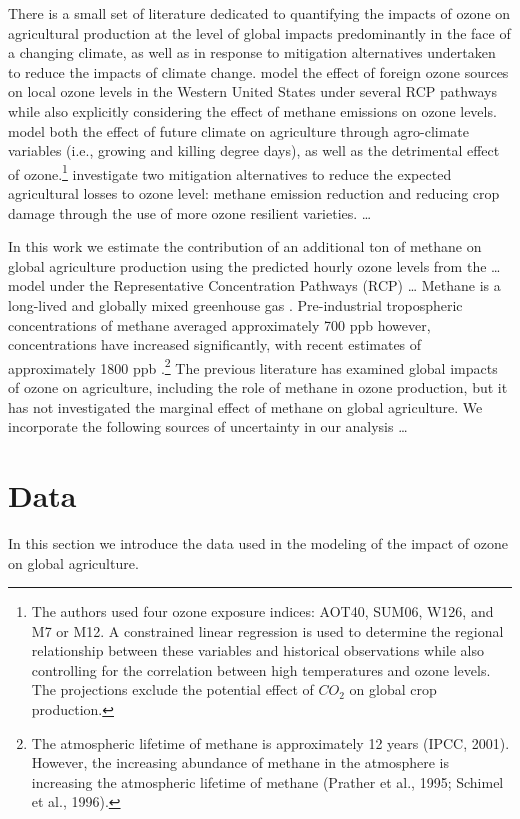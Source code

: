 \documentclass[10pt]{amsart}
\begin{document}
There is a small set of literature dedicated to quantifying the impacts of ozone on agricultural production at the level of global impacts predominantly in the face of a changing climate, as well as in response to mitigation alternatives undertaken to reduce the impacts of climate change. 
\cite{Lapina2015} model the effect of foreign ozone sources on local ozone levels in the Western United States under several RCP pathways while also explicitly considering the effect of methane emissions on ozone levels. 
\cite{Tai2014} model both the effect of future climate on agriculture through agro-climate variables (i.e., growing and killing degree days), as well as the detrimental effect of ozone.\footnote{The authors used four ozone exposure indices: AOT40, SUM06, W126, and M7 or M12. A constrained linear regression is used to determine the regional relationship between these variables and historical observations while also controlling for the correlation between high temperatures and ozone levels. The projections exclude the potential effect of $CO_2$ on global crop production.}  
\cite{Avnery2013} investigate two mitigation alternatives to reduce the expected agricultural losses to ozone level: methane emission reduction and reducing crop damage through the use of more ozone resilient varieties.
\cite{Wang2004} \ldots

In this work we estimate the contribution of an additional ton of methane on global agriculture production using the predicted hourly ozone levels from the \ldots model under the Representative Concentration Pathways (RCP) \ldots
Methane is a long-lived and globally mixed greenhouse gas \parencite{}.
Pre-industrial tropospheric concentrations of methane averaged approximately 700 ppb however, concentrations have increased significantly, with recent estimates of approximately 1800 ppb \parencite{}.\footnote{The atmospheric lifetime of methane is approximately 12 years \parencite{}(IPCC, 2001). However, the increasing abundance of methane in the atmosphere is increasing the atmospheric lifetime of methane \parencite{}(Prather et al., 1995; Schimel et al., 1996).}
The previous literature has examined global impacts of ozone on agriculture, including the role of methane in ozone production, but it has not investigated the marginal effect of methane on global agriculture. 
We incorporate the following sources of uncertainty in our analysis \ldots

 


\section{Data}
In this section we introduce the data used in the modeling of the impact of ozone on global agriculture. 
\end{document}
